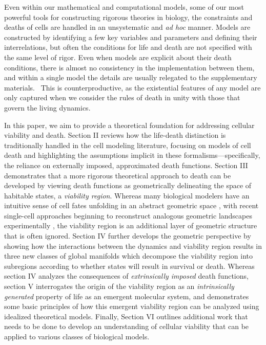 \documentclass{article}
\begin{document}
Even within our mathematical and computational models, some of our most powerful tools for constructing rigorous theories in biology, the constraints and deaths of cells are handled in an unsystematic and \textit{ad hoc }manner. Models are constructed by identifying a few key variables and parameters and defining their interrelations, but often the conditions for life and death are not specified with the same level of rigor. Even when models are explicit about their death conditions, there is almost no consistency in the implementation between them, and within a single model the details are usually relegated to the supplementary materials.  This is counterproductive, as the existential features of any model are only captured when we consider the rules of death in unity with those that govern the living dynamics. 

In this paper, we aim to provide a theoretical foundation for addressing cellular viability and death. Section II reviews how the life-death distinction is traditionally handled in the cell modeling literature, focusing on models of cell death and highlighting the assumptions implicit in these formalisms—specifically, the reliance on externally imposed, approximated death functions. Section III demonstrates that a more rigorous theoretical approach to death can be developed by viewing death functions as geometrically delineating the space of habitable states, a \textit{viability region}. Whereas many biological modelers have an intuitive sense of cell fates unfolding in an abstract geometric space \cite{waddington_strategy_1957, ferrell_bistability_2012, lange_cellrank_2022}, with recent single-cell approaches beginning to reconstruct analogous geometric landscapes experimentally \cite{bergen_generalizing_2020,weiler_cellrank_2024}, the viability region is an additional layer of geometric structure that is often ignored. Section IV further develops the geometric perspective by showing how the interactions between the dynamics and viability region results in three new classes of global manifolds which decompose the viability region into subregions according to whether states will result in survival or death. Whereas section IV analyzes the consequences of \textit{extrinsically imposed} death functions, section V interrogates the origin of the viability region as an \textit{intrinsically generated} property of life as an emergent molecular system, and demonstrates some basic principles of how this emergent viability region can be analyzed using idealized theoretical models. Finally, Section VI outlines additional work that needs to be done to develop an understanding of cellular viability that can be applied to various classes of biological models. 
\end{document}
